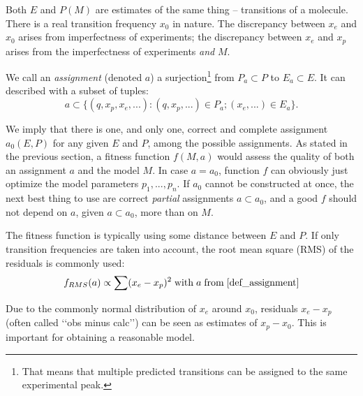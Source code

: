 \documentclass[11pt]{article}
\begin{document}
Both $E$ and $P(M)$ are estimates of the same thing -- transitions of a molecule. There is a real transition frequency $x_0$ in nature. The discrepancy between  $x_e$ and $x_0$ arises from imperfectness of experiments; the discrepancy between $x_e$ and $x_p$ arises from the imperfectness of experiments \emph{and} $M$.

We call an \emph{assignment} (denoted $a$) a surjection\footnote{That means that multiple predicted transitions can be assigned to the same experimental peak.} from $P_a \subset P$ to $E_a \subset E$. It can described with a subset of tuples: 
\begin{equation}
\label{def_assignment}
	a \subset \{(q, x_p, x_e, ...): (q, x_p, ...) \in P_a; (x_e, ...) \in E_a\}.
\end{equation}

We imply that there is one, and only one, correct and complete assignment $a_0(E, P)$ for any given $E$ and $P$, among the possible assignments. As stated in the previous section, a fitness function $f(M, a)$ would assess the quality of both an assignment $a$ and the model $M$. In case $a = a_0$, function $f$ can obviously just optimize the model parameters $p_1, ..., p_n$. If $a_0$ cannot be constructed at once, the next best thing to use are correct \emph{partial} assignments $a \subset a_0$, and a good $f$ should not depend on $a$, given $a \subset a_0$, more than on $M$.

The fitness function is typically using some distance between $E$ and $P$. If only transition frequencies are taken into account, the root mean square (RMS) of the residuals is commonly used:
\begin{equation}
\label{def_rms}
	f_{RMS}(a) \propto \sum (x_e - x_p)^2\;{\rm with}\;a\;{\rm from}\;\ref{def_assignment}
\end{equation}

Due to the commonly normal distribution of $x_e$ around $x_0$, residuals $x_e - x_p$ (often called \lq\lq{}obs minus calc\rq\rq{}) can be seen as estimates of $x_p - x_0$. This is important for obtaining a reasonable model. 

\end{document}
